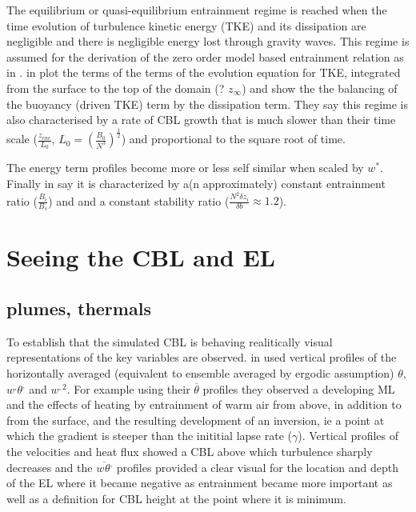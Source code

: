 The equilibrium or quasi-equilibrium entrainment regime is reached when the time evolution of turbulence kinetic energy (\acs{TKE})
 and its dissipation are negligible and there is negligible energy lost through gravity waves.  This regime is assumed for the derivation of
the zero order model based entrainment relation as in \cite{FedConzMir04}.  \citeauthor{GarciaMellado} in \cite{GarciaMellado} plot the 
terms of the terms of the evolution equation for \acs{TKE}, integrated from the surface to the top of the domain (? $z_{\infty}$) 
and show the the balancing of the buoyancy (driven TKE) term by the dissipation term.  They say this regime is also characterised 
by a rate of \acs{CBL} growth that is much slower than their time scale ($\frac{z_{enc}}{L_{0}}$, $L_{0} = \left(\frac{B_{0}}{N^{3}} \right)^{\frac{1}{2}}$)
and proportional to the square root of time.  %


The energy term profiles become more or less self similar when scaled by $w^{*}$. Finally
\citeauthor{FedConzMir04} in \cite{FedConzMir04} say it is characterized by a(n approximately) constant entrainment ratio ($\frac{B_{i}}{B_{s}}$) and
and a constant stability ratio ($\frac{N^{2}\delta z_{i}}{\delta b} \approx 1.2$).   

\section{Seeing the \acs{CBL} and \acs{EL}}
\label{SeingCBL}
\subsection{plumes, thermals}
To establish that the simulated \acs{CBL} is behaving realitically visual representations of the key variables are observed.
\citeauthor{SchmidtSchu} in \cite{SchmidtSchu} used vertical profiles of the horizontally averaged (equivalent to ensemble averaged
by ergodic assumption) $\theta$, $w^{,}\theta^{,}$ and $w^{,2}$.  For example using their $\overline{\theta}$ profiles they observed
a developing \acs{ML} and the effects of heating by entrainment of warm air from above, in addition to from the surface,  
and the resulting development of an inversion, ie a point at which the gradient is steeper than the inititial lapse rate ($\gamma$).  Vertical profiles of the velocities and heat flux
showed a \acs{CBL} above which turbulence sharply decreases and the $\overline{w^{}\theta^{,}}$ profiles provided a clear
visual for the location and depth of the \acs{EL} where it became negative as entrainment became more important as well
as a definition for \acs{CBL} height at the point where it is minimum.\\

